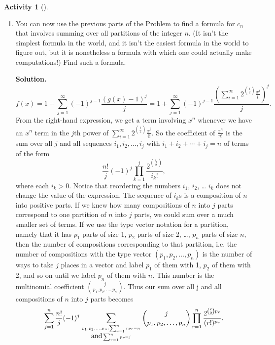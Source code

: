 \documentclass[10pt,]{book}
\theoremstyle{plain}
\theoremstyle{definition}
\newtheorem{activity}[project]{Activity}
\numberwithin{equation}{chapter}
\begin{document}
\begin{activity}[]
\begin{enumerate}[label=(\alph*)]
~\par
\item You can now use the previous parts of the Problem to find a formula for \(c_n\) that involves summing over all partitions of the integer \(n\). (It isn't the simplest formula in the world, and it isn't the easiest formula in the world to figure out, but it is nonetheless a formula with which one could actually make computations!)  Find such a  formula.%
\par\medskip\noindent%
\textbf{Solution.}\quad %
\begin{equation*}
f(x) = 1+\sum_{j=1}^\infty
(-1)^{j-1}\frac{(g(x)-1)^j}{j}= 1+\sum_{j=1}^\infty
(-1)^{j-1}\frac{(\sum_{i=1}^\infty 2^{\binom{i}{2}}\frac{x^i}{i!})^j}{j}.
\end{equation*}
From the right-hand expression, we get a term involving \(x^n\) whenever we have an \(x^n\) term in the \(j\)th power of \(\sum_{i=1}^\infty 2^{\binom{i}{2}}\frac{x^i}{i!}\). So the coefficient of \(\frac{x^n}{n!}\) is the sum over all \(j\) and all sequences \(i_1,i_2,\ldots,i_j\) with \(i_1+i_2+\cdots+i_j = n\) of terms of the form%
\begin{equation*}
\frac{n!}{j}(-1)^j\prod_{k=1}^j \frac{2^{\binom{i_k}{2}}
}{i_k!},
\end{equation*}
where each \(i_k>0\). Notice that reordering the numbers \(i_1\), \(i_2\), \dots{} \(i_k\) does not change the value of the expression. The sequence of \(i_k\)s is a composition of \(n\) into positive parts. If we knew how many compositions of \(n\) into \(j\) parts correspond to one partition of \(n\) into \(j\) parts, we could sum over a much smaller set of terms. If we use the type vector notation for a partition, namely that it has \(p_1\) parts of size 1, \(p_2\) parts of size 2, \dots{}, \(p_n\) parts of size \(n\), then the number of compositions corresponding to that partition, i.e. the number of compositions with the type vector \((p_1,p_2, \ldots, p_n)\) is the number of ways to take \(j\) places in a vector and label \(p_1\) of them with 1, \(p_2\) of them with 2, and so on until we label \(p_n\) of them with \(n\). This number is the multinomial coefficient \(\binom{j}{p_1,p_2,\ldots, p_n}\). Thus our sum over all j and all compositions of \(n\) into \(j\) parts becomes%
\begin{equation*}
\sum_{j=1}^n \frac{n!}{j}(-1)^j\sum_{{p_1,p_2,\ldots,p_n: \sum_{r=1}^n
rp_r =n \atop \mbox{and}  \sum_{r=1}^n p_r =j}}\binom{j}{p_1, p_2, \ldots,
p_n}
\prod_{r=1}^n\frac{2^{{\binom{r}{2}p_r}}
}{(r!)^{p_r}}.
\end{equation*}

\end{enumerate}
\end{activity}
\end{document}
